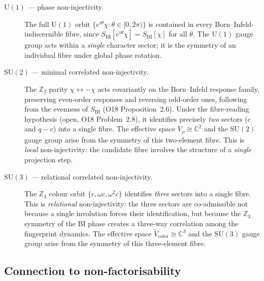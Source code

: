 \documentclass[11pt,a4paper]{article}
\theoremstyle{definition}
\theoremstyle{remark}
\newcommand{\SU}{\mathrm{SU}}
\newcommand{\Vr}{V_{\rho}}
\newcommand{\Z}{\mathbb{Z}}
\newcommand{\C}{\mathbb{C}}
\begin{document}
      \begin{description}
        \item[$\mathrm{U}(1)$ — phase non-injectivity.]
        The full $\mathrm{U}(1)$ orbit $\{e^{i\theta}\chi : \theta \in [0,2\pi)\}$ is contained in
        every Born--Infeld-indiscernible fibre, since $S_{\mathrm{BI}}[e^{i\theta}\chi] =
        S_{\mathrm{BI}}[\chi]$ for all $\theta$.
        The $\mathrm{U}(1)$ gauge group acts within a \emph{single} character sector; it is the
        symmetry of an individual fibre under global phase rotation.

        \item[$\SU(2)$ — minimal correlated non-injectivity.]
        The $\Z_2$ parity $\chi \leftrightarrow -\chi$ acts covariantly on the
        Born--Infeld response family, preserving even-order responses and reversing
        odd-order ones, following from the evenness of $S_{\mathrm{BI}}$
        (O18 Proposition~2.6).
        Under the fibre-reading hypothesis (open, O18 Problem~2.8), it identifies precisely
        \emph{two} sectors ($c$ and $q-c$) into a single fibre.
        The effective space $\Vr \cong \C^2$ and the $\SU(2)$ gauge group arise from the symmetry of
        this two-element fibre.
        This is \emph{local} non-injectivity: the candidate fibre involves the structure of
        a \emph{single} projection step.

        \item[$\SU(3)$ — relational correlated non-injectivity.]
        The $\Z_3$ colour orbit $\{c, \omega c, \omega^2 c\}$ identifies \emph{three} sectors into a
        single fibre.
        This is \emph{relational} non-injectivity: the three sectors are co-admissible not because a
        single involution forces their identification, but because the $\Z_3$ symmetry of the
        BI phase creates a three-way correlation among the fingerprint dynamics.
        The effective space $\tilde{V}_{\mathrm{color}} \cong \C^3$ and the $\SU(3)$ gauge group arise
        from the symmetry of this three-element fibre.
      \end{description}

    \subsection{Connection to non-factorisability}
      \label{ssec:non-factorizability}
\end{document}
